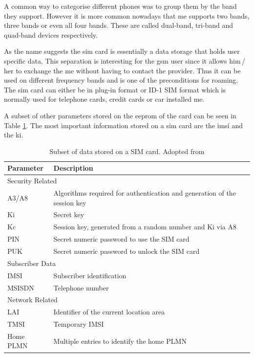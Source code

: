 A common way to categorise different phones was to group them by the band they support.
However it is more common nowadays that \gls{me} supports two bands, three bands or even all four bands.
These are called dual-band, tri-band and quad-band devices respectively.

As the name suggests the \gls{sim} card is essentially a data storage that holds user specific data.
This separation is interesting for the \gls{gsm} user since it allows him\,/\,her to exchange the \gls{me} without having to contact the provider.
Thus it can be used on different frequency bands and is one of the preconditions for roaming.
The \gls{sim} card can either be in plug-in format or ID-1 SIM format which is normally used for telephone cards, credit cards or car installed \gls{me}.

A subset of other parameters stored on the \gls{eeprom} of the card can be seen in Table \ref{tab:simdata}.
The most important information stored on a \gls{sim} card are the \gls{imsi} and the \gls{ki}.

\begin{table}
\centering
\begin{tabular}{@{}l>{\raggedright\arraybackslash}p{}@{}}
\toprule
Parameter		&Description\\
\midrule
\multicolumn{2}{l}{Security Related}\\
\midrule
A3/A8			&Algorithms required for authentication and generation of the session key\\
Ki				&Secret key\\
Kc				&Session key, generated from a random number and Ki via A8\\
PIN				&Secret numeric password to use the SIM card\\
PUK				&Secret numeric password to unlock the SIM card\\
\midrule
\multicolumn{2}{l}{Subscriber Data}\\
\midrule
IMSI			&Subscriber identification\\
MSISDN			&Telephone number\\
\midrule
\multicolumn{2}{l}{Network Related}\\
\midrule
LAI				&Identifier of the current location area\\
TMSI			&Temporary IMSI\\
Home PLMN		&Multiple entries to identify the home PLMN\\
\bottomrule
\end{tabular}
\caption{Subset of data stored on a SIM card. Adopted from \cite{protocols1999}}
\label{tab:simdata}
\end{table}

